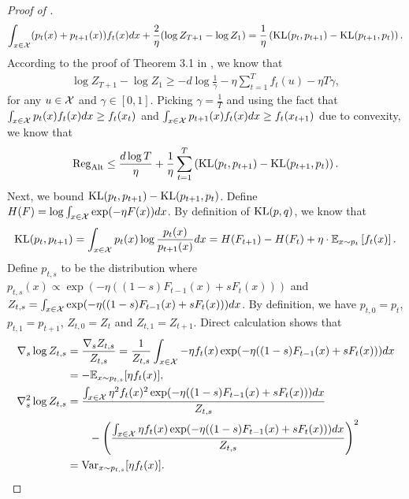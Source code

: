 \begin{proof}[Proof of ]
    \begin{align}
        \int_{x\in{\mathcal{X}}}(p_t(x)+p_{t+1}(x))f_t(x)dx + \frac{2}{\eta}(\log Z_{T+1} - \log Z_{1}) = \frac{1}{\eta}\left(\text{\rm KL}(p_t,p_{t+1}) - \text{\rm KL}(p_{t+1},p_t)\right) .\label{eqn:alt-regret-cont}
    \end{align}
    According to the proof of Theorem 3.1 in \citet{bubeck2011introduction}, we know that 
    \begin{align*}
        \log Z_{T+1} - \log Z_{1} \geq -d\log\frac{1}{\gamma} - \eta \sum_{t=1}^Tf_t(u) - \eta T\gamma,
    \end{align*}
    for any $u\in{\mathcal{X}}$ and $\gamma\in [0,1]$. Picking $\gamma = \frac{1}{T}$ and using the fact that $\int_{x\in{\mathcal{X}}}p_t(x)f_t(x)dx\geq f_t(x_t)$ and $\int_{x\in{\mathcal{X}}}p_{t+1}(x)f_t(x)dx\geq f_t(x_{t+1})$ due to convexity, we know that
\begin{align}\label{eqn:reg-cont-main}
    \mathrm{Reg}_{\mathrm{Alt}} \leq \frac{d\log T}{\eta} + \frac{1}{\eta}\sum_{t=1}^T\left(\text{\rm KL}(p_t,p_{t+1})-\text{\rm KL}(p_{t+1},p_t)\right).
\end{align}
Next, we bound $\text{\rm KL}(p_t,p_{t+1})-\text{\rm KL}(p_{t+1},p_t)$. Define $H(F) = \log\int_{x\in{\mathcal{X}}}\exp(-\eta F(x))dx$.
By definition of $\text{\rm KL}(p,q)$, we know that
\begin{align}\label{eqn:KL}
    \text{\rm KL}(p_t,p_{t+1}) = \int_{x\in{\mathcal{X}}}p_t(x)\log\frac{p_t(x)}{p_{t+1}(x)}dx = H(F_{t+1}) - H(F_{t}) + \eta\cdot \mathbb{E}_{x\sim p_t}\left[f_t(x)\right].
\end{align}
Define $p_{t,s}$ to be the distribution where $p_{t,s}(x)\propto \exp(-\eta ((1-s) F_{t-1}(x) +sF_{t}(x)))$ and $Z_{t,s}=\int_{x\in{\mathcal{X}}}\exp(-\eta ((1-s)F_{t-1}(x) +sF_{t}(x)))dx$. By definition, we have $p_{t,0}=p_t$, $p_{t,1}=p_{t+1}$, $Z_{t,0}=Z_t$ and $Z_{t,1}=Z_{t+1}$. Direct calculation shows that
\begin{align}
    \nabla_s\log Z_{t,s} &= \frac{\nabla_s Z_{t,s}}{Z_{t,s}} = \frac{1}{Z_{t,s}}\int_{x\in{\mathcal{X}}}-\eta f_t(x)\exp(-\eta((1-s)F_{t-1}(x)+sF_t(x)))dx \nonumber \\
    &= -\mathbb{E}_{x\sim p_{t,s}}[\eta f_t(x)], \label{eqn:mean_exp}\\
    \nabla_s^2\log Z_{t,s} &= \frac{\int_{x\in{\mathcal{X}}}\eta^2f_t(x)^2\exp(-\eta((1-s)F_{t-1}(x)+sF_t(x)))dx}{Z_{t,s}} \nonumber \\
    &\qquad - \left(\frac{\int_{x\in{\mathcal{X}}}\eta f_t(x)\exp(-\eta((1-s)F_{t-1}(x)+sF_t(x)))dx}{Z_{t,s}}\right)^2 \nonumber\\
    &=\mathrm{Var}_{x\sim p_{t,s}}[\eta f_t(x)]. \label{eqn:var_exp}
\end{align}


\end{proof}
